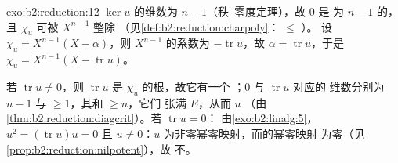 \begin{solution}{exo:b2:reduction:12}
$\ker u$ 的维数为 $n - 1$（秩–零度定理），故 $0$ 是
为 $n - 1$ 的，且 $\chi_u$ 可被
$X^{n-1}$ 整除
（见\cref{def:b2:reduction:charpoly}： $\leq$ ）。
设 $\chi_u = X^{n-1}(X - \alpha)$，则
$X^{n-1}$ 的系数为 $-\operatorname{tr} u$，故 $\alpha =
\operatorname{tr} u$，于是 $\chi_u = X^{n-1}(X - \operatorname{tr}
u)$。

若 $\operatorname{tr} u \neq 0$，则
$\operatorname{tr} u$ 是 $\chi_u$ 的根，故它有一个
；$0$ 与 $\operatorname{tr} u$ 对应的
维数分别为 $n - 1$ 与 $\geq 1$，其和 $\geq n$，它们
张满 $E$，从而 $u$ 
（由\cref{thm:b2:reduction:diagcrit}）。若 $\operatorname{tr} u = 0$：
由\cref{exo:b2:linalg:5}，$u^2 = (\operatorname{tr} u)u = 0$
且 $u \neq 0$：$u$ 为非零幂零映射，而的幂零映射
为零（见\cref{prop:b2:reduction:nilpotent}），故
不。
\end{solution}

